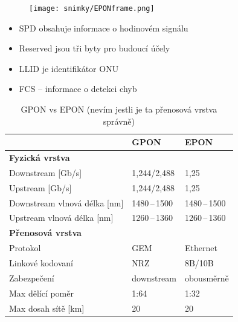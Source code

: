 \begin{figure} [h]
    \centering
    \texttt{[image: snimky/EPONframe.png]}
\end{figure}

\begin{itemize}
    \item SPD obsahuje informace o hodinovém signálu
    \item Reserved jsou tři byty pro budoucí účely
    \item LLID je identifikátor ONU
    \item FCS -- informace o detekci chyb
\end{itemize}

\clearpage

\begin{table}[ht]
    \centering
    \caption{GPON vs EPON (nevím jestli je ta přenosová vrstva správně)}
    \begin{tabular}{|l|l|l|}
        \hline
                                     & GPON           & EPON           \\\hline\hline
        \textbf{Fyzická vrstva}      &                &                \\\hline\hline
        Downstream [Gb/s]            & 1,244/2,488    & 1,25           \\\hline
        Upstream [Gb/s]              & 1,244/2,488    & 1,25           \\\hline
        Downstream vlnová délka [nm] & 1480\,--\,1500 & 1480\,--\,1500 \\\hline
        Upstream vlnová délka [nm]   & 1260\,--\,1360 & 1260\,--\,1360 \\\hline\hline
        \textbf{Přenosová vrstva}    &                &                \\\hline\hline
        Protokol                     & GEM            & Ethernet       \\\hline
        Linkové kodovaní             & NRZ            & 8B/10B         \\\hline
        Zabezpečení                  & downstream     & obousměrně     \\\hline
        Max dělící poměr             & 1:64           & 1:32           \\\hline
        Max dosah sítě [km]          & 20             & 20             \\\hline
    \end{tabular}
\end{table}

